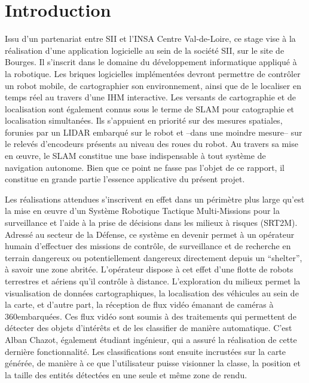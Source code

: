 \chapter*{Introduction}

Issu d’un partenariat entre \gls{SII} et l’INSA Centre Val-de-Loire, ce stage vise à la réalisation d’une application logicielle au sein de la société SII, sur le site de Bourges. 
Il s’inscrit dans le domaine du développement informatique appliqué à la robotique. 
Les briques logicielles implémentées devront permettre de contrôler un robot mobile, de cartographier son environnement, ainsi que de le localiser en temps réel au travers d'une \gls{IHM} interactive. 
Les versants de cartographie et de localisation sont également connus sous le terme de \gls{SLAM} pour catographie et localisation simultanées. 
Ils s’appuient en priorité sur des mesures spatiales, forunies par un \gls{LIDAR} embarqué sur le robot et --dans une moindre mesure-- sur le relevés d'encodeurs présents au niveau des roues du robot.
Au travers sa mise en \oe{}uvre, le \gls{SLAM} constitue une base indispensable à tout système de navigation autonome. 
Bien que ce point ne fasse pas l'objet de ce rapport, il constitue en grande partie l'essence applicative du présent projet. 

Les réalisations attendues s'inscrivent en effet dans un périmètre plus large qu’est la mise en \oe{}uvre d’un Système Robotique Tactique Multi-Missions pour la surveillance et l’aide à la prise de décisions dans les milieux à risques (\gls{SRT2M}).
Adressé au secteur de la Défense, ce système en devenir permet à un opérateur humain d’effectuer des missions de contrôle, de surveillance et de recherche en terrain dangereux ou potentiellement dangereux directement depuis un ``shelter'', à savoir une zone abritée. 
L’opérateur dispose à cet effet d’une flotte de robots terrestres et aériens qu’il contrôle à distance. 
L'exploration du milieux permet la visualisation de données cartographiques, la localisation des véhicules au sein de la carte, et d’autre part, la réception
de flux vidéo émanant de caméras à 360\degre embarquées. 
Ces flux vidéo sont soumis à des traitements qui permettent de détecter des objets d’intérêts et de les classifier de manière automatique. 
C'est Alban Chazot, également étudiant ingénieur, qui a assuré la réalisation de cette dernière fonctionnalité.   
Les classifications sont ensuite incrustées sur la carte générée, de manière à ce que l'utilisateur puisse visionner la classe, la position et la taille des entités détectées en une seule et même zone de rendu. 

